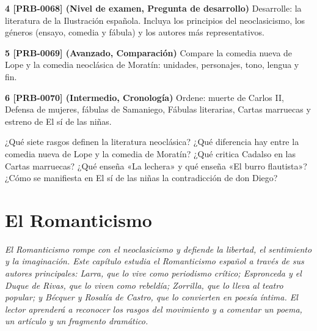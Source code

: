 \documentclass{book}
\begin{document}
\begin{tcolorbox}[title={Ejercicios}, studiumworked, breakable]
\noindent\textbf{4 [PRB-0068] (Nivel de examen, Pregunta de desarrollo)}
Desarrolle: la literatura de la Ilustración española. Incluya los principios del neoclasicismo, los géneros (ensayo, comedia y fábula) y los autores más representativos.


\noindent\textbf{5 [PRB-0069] (Avanzado, Comparación)}
Compare la comedia nueva de Lope y la comedia neoclásica de Moratín: unidades, personajes, tono, lengua y fin.


\noindent\textbf{6 [PRB-0070] (Intermedio, Cronología)}
Ordene: muerte de Carlos II, Defensa de mujeres, fábulas de Samaniego, Fábulas literarias, Cartas marruecas y estreno de El sí de las niñas.

\end{tcolorbox}

\begin{tcolorbox}[title={Autoficha}, studiumcheck, breakable]

¿Qué siete rasgos definen la literatura neoclásica? ¿Qué diferencia hay entre la comedia nueva de Lope y la comedia de Moratín? ¿Qué critica Cadalso en las Cartas marruecas? ¿Qué enseña «La lechera» y qué enseña «El burro flautista»? ¿Cómo se manifiesta en El sí de las niñas la contradicción de don Diego?

\end{tcolorbox}

\chapter{El Romanticismo}
\label{chap:lit-09}

\noindent\textit{El Romanticismo rompe con el neoclasicismo y defiende la libertad, el sentimiento y la imaginación. Este capítulo estudia el Romanticismo español a través de sus autores principales: Larra, que lo vive como periodismo crítico; Espronceda y el Duque de Rivas, que lo viven como rebeldía; Zorrilla, que lo lleva al teatro popular; y Bécquer y Rosalía de Castro, que lo convierten en poesía íntima. El lector aprenderá a reconocer los rasgos del movimiento y a comentar un poema, un artículo y un fragmento dramático.}

\end{document}
